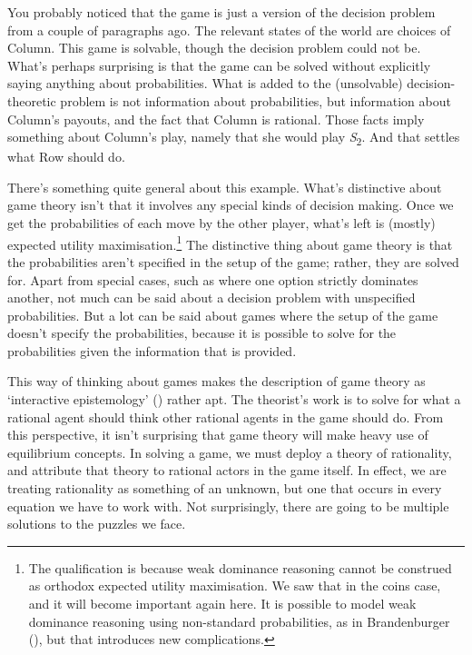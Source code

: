 \documentclass[
  12pt,
  letterpaper,
]{scrbook}
\begin{document}
You probably noticed that the game is just a version of the decision
problem from a couple of paragraphs ago. The relevant states of the
world are choices of Column. This game is solvable, though the decision
problem could not be. What's perhaps surprising is that the game can be
solved without explicitly saying anything about probabilities. What is
added to the (unsolvable) decision-theoretic problem is not information
about probabilities, but information about Column's payouts, and the
fact that Column is rational. Those facts imply something about Column's
play, namely that she would play \emph{S}\textsubscript{2}. And that
settles what Row should do.

There's something quite general about this example. What's distinctive
about game theory isn't that it involves any special kinds of decision
making. Once we get the probabilities of each move by the other player,
what's left is (mostly) expected utility maximisation.\footnote{The
  qualification is because weak dominance reasoning cannot be construed
  as orthodox expected utility maximisation. We saw that in the coins
  case, and it will become important again here. It is possible to model
  weak dominance reasoning using non-standard probabilities, as in
  Brandenburger (), but that
  introduces new complications.} The distinctive thing about game theory
is that the probabilities aren't specified in the setup of the game;
rather, they are solved for. Apart from special cases, such as where one
option strictly dominates another, not much can be said about a decision
problem with unspecified probabilities. But a lot can be said about
games where the setup of the game doesn't specify the probabilities,
because it is possible to solve for the probabilities given the
information that is provided.

This way of thinking about games makes the description of game theory as
`interactive epistemology' ()
rather apt. The theorist's work is to solve for what a rational agent
should think other rational agents in the game should do. From this
perspective, it isn't surprising that game theory will make heavy use of
equilibrium concepts. In solving a game, we must deploy a theory of
rationality, and attribute that theory to rational actors in the game
itself. In effect, we are treating rationality as something of an
unknown, but one that occurs in every equation we have to work with. Not
surprisingly, there are going to be multiple solutions to the puzzles we
face.
\end{document}
